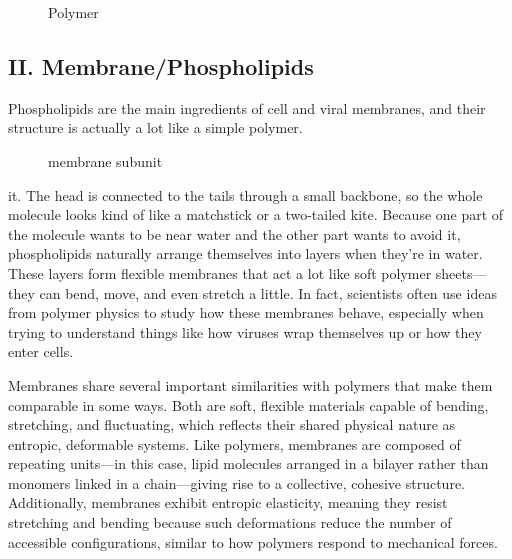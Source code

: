 \documentclass[12pt]{article}
\begin{document}
\begin{flushleft}
\begin{figure}[!ht]
  \centering
  
  \caption{Polymer}
\end{figure}


\vspace{-2em} 
\subsection*{II. Membrane/Phospholipids}
Phospholipids are the main ingredients of cell and viral membranes, and their structure is actually a lot like a simple polymer. 

\begin{figure}[!ht]
  \centering
  \caption{membrane subunit}
\end{figure}



\noindent it. The head is connected to the tails through a small backbone, so the whole molecule looks kind of like a matchstick or a two-tailed kite. Because one part of the molecule wants to be near water and the other part wants to avoid it, phospholipids naturally arrange themselves into layers when they’re in water. These layers form flexible membranes that act a lot like soft polymer sheets—they can bend, move, and even stretch a little. In fact, scientists often use ideas from polymer physics to study how these membranes behave, especially when trying to understand things like how viruses wrap themselves up or how they enter cells.



Membranes share several important similarities with polymers that make them comparable in some ways. Both are soft, flexible materials capable of bending, stretching, and fluctuating, which reflects their shared physical nature as entropic, deformable systems. Like polymers, membranes are composed of repeating units—in this case, lipid molecules arranged in a bilayer rather than monomers linked in a chain—giving rise to a collective, cohesive structure. Additionally, membranes exhibit entropic elasticity, meaning they resist stretching and bending because such deformations reduce the number of accessible configurations, similar to how polymers respond to mechanical forces.



\end{flushleft}
\end{document}
